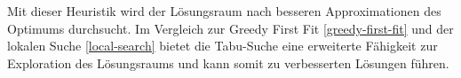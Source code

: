 \documentclass{article}
\begin{document}
\vspace{0.7cm}

Mit dieser Heuristik wird der Lösungsraum nach besseren Approximationen des Optimums durchsucht. 
Im Vergleich zur Greedy First Fit \ref{greedy-first-fit} und der 
lokalen Suche \ref{local-search} bietet die Tabu-Suche eine erweiterte Fähigkeit zur Exploration 
des Lösungsraums und kann somit zu verbesserten Lösungen führen.



\vfill




\end{document}
